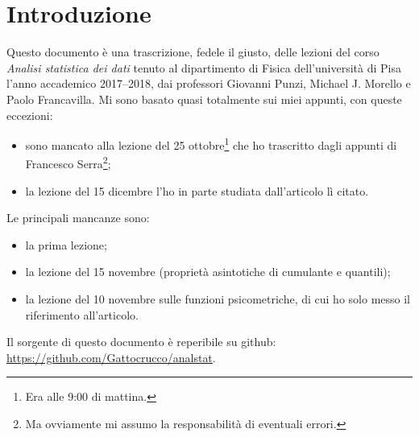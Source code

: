 
\chapter*{Introduzione}

Questo documento è una trascrizione, fedele il giusto,
delle lezioni del corso \emph{Analisi statistica dei dati}
tenuto al dipartimento di Fisica dell'università di Pisa
l'anno accademico 2017--2018,
dai professori Giovanni Punzi, Michael J. Morello e Paolo Francavilla.
Mi sono basato quasi totalmente sui miei appunti,
con queste eccezioni:
\begin{itemize}
	\item sono mancato alla lezione del 25 ottobre\footnote{Era alle 9:00 di mattina.} che ho trascritto dagli appunti di Francesco Serra\footnote{Ma ovviamente mi assumo la responsabilità di eventuali errori.};
	\item la lezione del 15 dicembre l'ho in parte studiata dall'articolo lì citato.
\end{itemize}
Le principali mancanze sono:
\begin{itemize}
	\item la prima lezione;
	\item la lezione del 15 novembre (proprietà asintotiche di cumulante e quantili);
	\item la lezione del 10 novembre sulle funzioni psicometriche,
	di cui ho solo messo il riferimento all'articolo. 
\end{itemize}
Il sorgente di questo documento è reperibile su github:\\
\url{https://github.com/Gattocrucco/analstat}.
